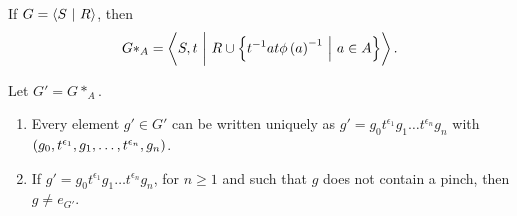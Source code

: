 
\begin{remark}
If $ G = \left\langle S \ \middle| \  R \right\rangle $, then
$$ G *_A = \abr{S, t \st R \cup \cbr{t^{-1}at\phi\br{a}^{-1} \st a \in A}}. $$
\end{remark}

\pagebreak

\begin{theorem}
Let $ G' = G *_A $.
\begin{enumerate}
\item Every element $ g' \in G' $ can be written uniquely as $ g' = g_0t^{\epsilon_1}g_1 \dots t^{\epsilon_n}g_n $ with $ \br{g_0, t^{\epsilon_1}, g_1, \dots, t^{\epsilon_n}, g_n} $.
\item If $ g' = g_0t^{\epsilon_1}g_1 \dots t^{\epsilon_n}g_n $, for $ n \ge 1 $ and such that $ g $ does not contain a pinch, then $ g \ne e_{G'} $.
\end{enumerate}
\end{theorem}

